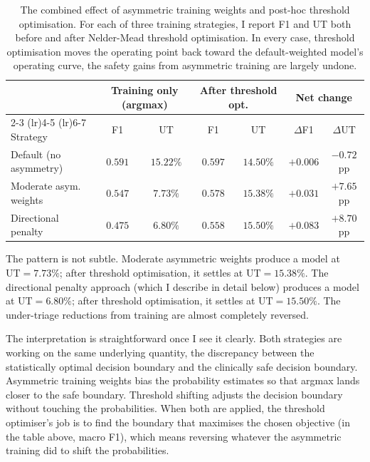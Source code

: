 \begin{table}[htbp]
 \centering
 \caption[Combining training weights with threshold optimisation]{The combined effect of asymmetric training weights and post-hoc threshold optimisation. For each of three training strategies, I report F1 and UT both before and after Nelder-Mead threshold optimisation. In every case, threshold optimisation moves the operating point back toward the default-weighted model's operating curve, the safety gains from asymmetric training are largely undone.}
 \label{tab:substitute}
 \small
 \begin{tabular}{lcccccc}
 \toprule
 & \multicolumn{2}{c}{Training only (argmax)} & \multicolumn{2}{c}{After threshold opt.} & \multicolumn{2}{c}{Net change} \\
 \cmidrule(lr){2-3} \cmidrule(lr){4-5} \cmidrule(lr){6-7}
 Strategy & F1 & UT & F1 & UT & $\Delta$F1 & $\Delta$UT \\
 \midrule
 Default (no asymmetry) & $0.591$ & $15.22\%$ & $0.597$ & $14.50\%$ & $+0.006$ & $-0.72$pp \\
 Moderate asym. weights & $0.547$ & $7.73\%$ & $0.578$ & $15.38\%$ & $+0.031$ & $+7.65$pp \\
 Directional penalty & $0.475$ & $6.80\%$ & $0.558$ & $15.50\%$ & $+0.083$ & $+8.70$pp \\
 \bottomrule
 \end{tabular}
\end{table}

The pattern is not subtle. Moderate asymmetric weights produce a model at $\text{UT} = 7.73\%$; after threshold optimisation, it settles at $\text{UT} = 15.38\%$. The directional penalty approach (which I describe in detail below) produces a model at $\text{UT} = 6.80\%$; after threshold optimisation, it settles at $\text{UT} = 15.50\%$. The under-triage reductions from training are almost completely reversed.

The interpretation is straightforward once I see it clearly. Both strategies are working on the same underlying quantity, the discrepancy between the statistically optimal decision boundary and the clinically safe decision boundary. Asymmetric training weights bias the probability estimates so that argmax lands closer to the safe boundary. Threshold shifting adjusts the decision boundary without touching the probabilities. When both are applied, the threshold optimiser's job is to find the boundary that maximises the chosen objective (in the table above, macro F1), which means reversing whatever the asymmetric training did to shift the probabilities.

